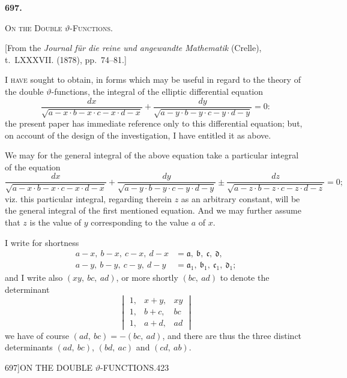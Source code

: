 \documentclass[11pt]{article}
\begin{document}
\bigskip
\begin{center}\textbf{\large 697.}\end{center}

\bigskip
\begin{center}\textsc{On the Double $\vartheta$-Functions.}\end{center}

\begin{center}\small [From the \textit{Journal f\"{u}r die reine und angewandte Mathematik} (Crelle), t.~LXXXVII. (1878), pp.~74--81.]\end{center}

I \textsc{have} sought to obtain, in forms which may be useful in regard to the theory of the double $\vartheta$-functions, the integral of the elliptic differential equation
\[ \frac{dx}{\sqrt{a-x \cdot b-x \cdot c-x \cdot d-x}} + \frac{dy}{\sqrt{a-y \cdot b-y \cdot c-y \cdot d-y}} = 0: \]
the present paper has immediate reference only to this differential equation; but, on account of the design of the investigation, I have entitled it as above.

We may for the general integral of the above equation take a particular integral of the equation
\[ \frac{dx}{\sqrt{a-x \cdot b-x \cdot c-x \cdot d-x}} + \frac{dy}{\sqrt{a-y \cdot b-y \cdot c-y \cdot d-y}} \pm \frac{dz}{\sqrt{a-z \cdot b-z \cdot c-z \cdot d-z}} = 0; \]
viz. this particular integral, regarding therein $z$ as an arbitrary constant, will be the general integral of the first mentioned equation. And we may further assume that $z$ is the value of $y$ corresponding to the value $a$ of $x$.

I write for shortness
\begin{align*}
a-x,\ b-x,\ c-x,\ d-x &= \mathfrak{a},\ \mathfrak{b},\ \mathfrak{c},\ \mathfrak{d},\\
a-y,\ b-y,\ c-y,\ d-y &= \mathfrak{a}_{1},\ \mathfrak{b}_{1},\ \mathfrak{c}_{1},\ \mathfrak{d}_{1};
\end{align*}
and I write also $(xy,\ bc,\ ad)$, or more shortly $(bc,\ ad)$ to denote the determinant
\[ \begin{vmatrix} 1, & x+y, & xy\\ 1, & b+c, & bc\\ 1, & a+d, & ad \end{vmatrix} \]
we have of course $(ad,\ bc) = -(bc,\ ad)$, and there are thus the three distinct determinants $(ad,\ bc)$, $(bd,\ ac)$ and $(cd,\ ab)$.

\clearpage
\begin{center}\small 697]\hfill ON THE DOUBLE $\vartheta$-FUNCTIONS.\hfill 423\end{center}
\end{document}
